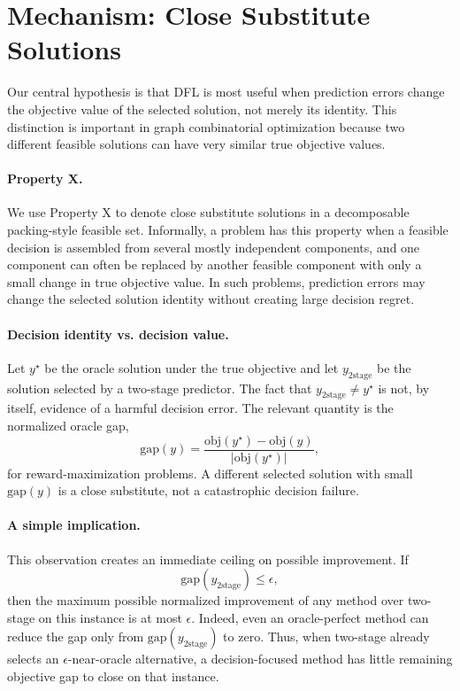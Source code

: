 \section{Mechanism: Close Substitute Solutions}

Our central hypothesis is that DFL is most useful when prediction errors change
the objective value of the selected solution, not merely its identity. This
distinction is important in graph combinatorial optimization because two
different feasible solutions can have very similar true objective values.

\paragraph{Property X.}
We use Property X to denote close substitute solutions in a decomposable
packing-style feasible set. Informally, a problem has this property when a
feasible decision is assembled from several mostly independent components, and
one component can often be replaced by another feasible component with only a
small change in true objective value. In such problems, prediction errors may
change the selected solution identity without creating large decision regret.

\paragraph{Decision identity vs. decision value.}
Let $y^\star$ be the oracle solution under the true objective and let
$y_{\mathrm{2stage}}$ be the solution selected by a two-stage predictor. The fact
that $y_{\mathrm{2stage}} \neq y^\star$ is not, by itself, evidence of a harmful
decision error. The relevant quantity is the normalized oracle gap,
\[
    \mathrm{gap}(y)
    =
    \frac{\mathrm{obj}(y^\star)-\mathrm{obj}(y)}
    {|\mathrm{obj}(y^\star)|},
\]
for reward-maximization problems. A different selected solution with small
$\mathrm{gap}(y)$ is a close substitute, not a catastrophic decision failure.

\paragraph{A simple implication.}
This observation creates an immediate ceiling on possible improvement. If
\[
    \mathrm{gap}(y_{\mathrm{2stage}}) \le \epsilon,
\]
then the maximum possible normalized improvement of any method over two-stage
on this instance is at most $\epsilon$. Indeed, even an oracle-perfect method
can reduce the gap only from $\mathrm{gap}(y_{\mathrm{2stage}})$ to zero. Thus,
when two-stage already selects an $\epsilon$-near-oracle alternative, a
decision-focused method has little remaining objective gap to close on that
instance.

